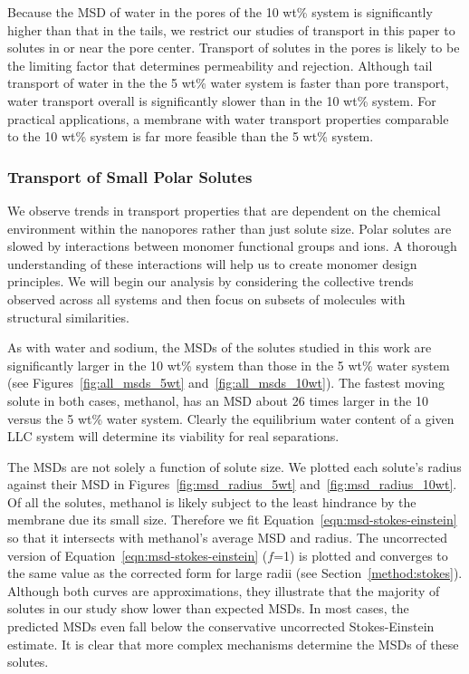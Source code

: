 \documentclass[journal=jpcbfk,manuscript=article]{achemso}
\begin{document}
  Because the MSD of water in the pores of the 10 wt\% system is significantly
  higher than that in the tails, we restrict our studies of transport in this
  paper to solutes in or near the pore center. Transport of solutes in the pores
  is likely to be the limiting factor that determines permeability and rejection.
  Although tail transport of water in the the 5 wt\% water system is faster than
  pore transport, water transport overall is significantly slower than in the 10
  wt\% system. For practical applications, a membrane with water transport
  properties comparable to the 10 wt\% system is far more feasible than the 5
  wt\% system.

 \subsubsection{Transport of Small Polar Solutes}\label{section:general_transport_solutes}  
  
  We observe trends in transport properties that are dependent on the chemical 
  environment within the nanopores rather than just solute size. Polar solutes
  are slowed by interactions between monomer functional groups and ions. 
  A thorough understanding of these interactions will help us to create monomer
  design principles. We will begin our analysis by considering the collective
  trends observed across all systems and then focus on subsets of molecules
  with structural similarities.

  As with water and sodium, the MSDs of the solutes studied in this work are 
  significantly larger in the 10 wt\% system than those in the 5 wt\% water 
  system (see Figures~\ref{fig:all_msds_5wt} and~\ref{fig:all_msds_10wt}). The fastest moving solute in both cases, 
  methanol, has an MSD about 26 times larger in the 10 versus the 5 wt\%
  water system. Clearly the equilibrium water content of a given LLC system will 
  determine its viability for real separations.
  
  The MSDs are not solely a function of solute size. We plotted each solute's radius
  against their MSD in Figures~\ref{fig:msd_radius_5wt} and~\ref{fig:msd_radius_10wt}.
  Of all the solutes, methanol is likely subject to the least hindrance by
  the membrane due its small size. Therefore we fit Equation~\ref{eqn:msd-stokes-einstein}
  so that it intersects with methanol's average MSD and radius. The uncorrected version of 
  Equation~\ref{eqn:msd-stokes-einstein} ($f$=1) is plotted and converges to the same value as the
  corrected form for large radii (see Section~\ref{method:stokes}). Although both curves are 
  approximations, they illustrate that the majority of solutes in our study show
  lower than expected MSDs. In most cases, the predicted MSDs even fall below the 
  conservative uncorrected Stokes-Einstein estimate. It is clear that more complex
  mechanisms determine the MSDs of these solutes.
  
\end{document}
